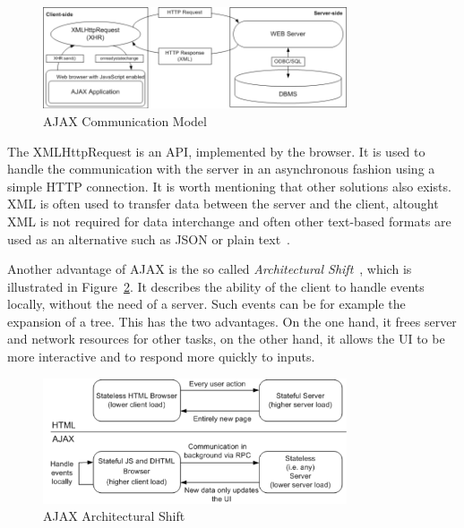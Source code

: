 \begin{figure}[h]
	\begin{center}
		\includegraphics[width=0.8\textwidth]{./img/ajax01a.png}
		\caption{AJAX Communication Model}
		\label{fig:ajax01}
	\end{center}
\end{figure}

The XMLHttpRequest is an API, implemented by the browser. It is 
used to handle the communication with the server in an asynchronous fashion using a
simple HTTP connection. It is worth mentioning that other solutions also exists. 
XML is often used to transfer data between the server and the client, 
altought XML is not required for data interchange and often other text-based
formats are used as an alternative such as JSON or plain text~\cite{bajax1}.

Another advantage of AJAX is the so called \textit{Architectural Shift}~\cite{wgdd1}, 
which is illustrated in Figure~\ref{fig:ajax02}. 
It describes the ability of the client to handle events
locally, without the need of a server. Such events can be for example the
expansion of a tree. This has the two advantages. On the one hand, it frees server 
and network resources for other tasks, on the other hand, it allows
the UI to be more interactive and to respond more quickly to inputs.

\begin{figure}[h]
	\begin{center}
		\includegraphics[width=0.8\textwidth]{./img/ajax02a.png}
		\caption{AJAX Architectural Shift}
		\label{fig:ajax02}
	\end{center}
\end{figure}


